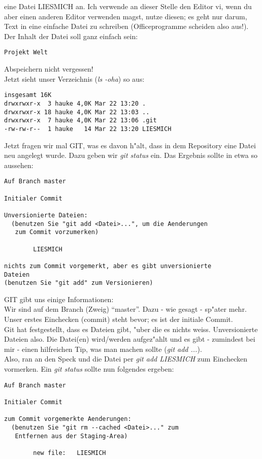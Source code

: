\documentclass[german,a4paper]{report}
\begin{document}
eine Datei LIESMICH an. Ich verwende an dieser Stelle den Editor vi, wenn du aber einen
anderen Editor verwenden magst, nutze diesen; es geht nur darum, Text in eine einfache
Datei zu schreiben (Officeprogramme scheiden also aus!).\\
Der Inhalt der Datei soll ganz einfach sein:
\begin{verbatim}
Projekt Welt
\end{verbatim}
Abspeichern nicht vergessen!\\
Jetzt sieht unser Verzeichnis (\textit{ls -oha}) so aus:
\begin{verbatim}
insgesamt 16K
drwxrwxr-x  3 hauke 4,0K Mar 22 13:20 .
drwxrwxr-x 18 hauke 4,0K Mar 22 13:03 ..
drwxrwxr-x  7 hauke 4,0K Mar 22 13:06 .git
-rw-rw-r--  1 hauke   14 Mar 22 13:20 LIESMICH
\end{verbatim}
Jetzt fragen wir mal GIT, was es davon h"alt, dass in dem Repository eine Datei neu
angelegt wurde. Dazu geben wir \textit{git status} ein. Das Ergebnis sollte in etwa so aussehen:
\begin{verbatim}
Auf Branch master

Initialer Commit

Unversionierte Dateien:
  (benutzen Sie "git add <Datei>...", um die Aenderungen
   zum Commit vorzumerken)

        LIESMICH

nichts zum Commit vorgemerkt, aber es gibt unversionierte
Dateien
(benutzen Sie "git add" zum Versionieren)
\end{verbatim}
GIT gibt uns einige Informationen:\\
Wir sind auf dem Branch (Zweig) ``master''. Dazu - wie gesagt - sp"ater mehr.\\
Unser erstes Einchecken (commit) steht bevor; es ist der initiale Commit.\\
Git hat festgestellt, dass es Dateien gibt, "uber die es nichts weiss. Unversionierte
Dateien also. Die Datei(en) wird/werden aufgez"ahlt und es gibt - zumindest bei mir -
einen hilfreichen Tip, was man machen sollte (\textit{git add ...}).\\
Also, ran an den Speck und die Datei per \textit{git add LIESMICH} zum Einchecken vormerken.
Ein \textit{git status} sollte nun folgendes ergeben:
\begin{verbatim}
Auf Branch master

Initialer Commit

zum Commit vorgemerkte Aenderungen:
  (benutzen Sie "git rm --cached <Datei>..." zum
   Entfernen aus der Staging-Area)

        new file:   LIESMICH
\end{verbatim}
\end{document}
